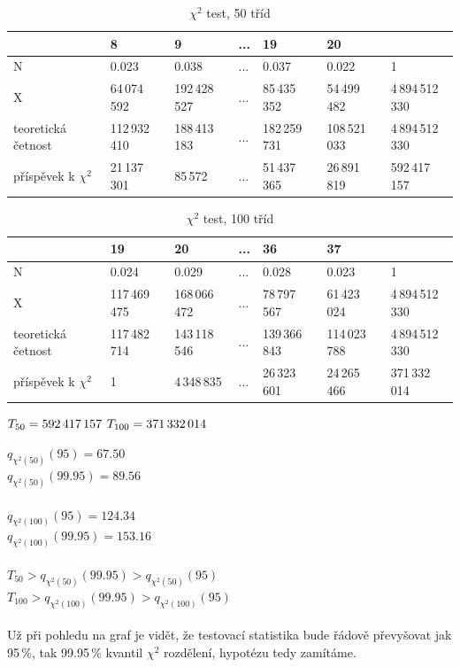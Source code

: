 \documentclass[fleqn,11pt]{article}
\begin{document}
    \begin{table}[htp]
        \footnotesize
        \caption*{$\chi^2$ test, 50 tříd}
        \centering
        \begin{tabular}{|l|l|l|l|l|l||l|}
        \hline
         & 8 & 9 & ... & 19 & 20 & \\ \hline
        N& 0.023 & 0.038 & ... & 0.037 & 0.022 & 1 \\ \hline
        X& 64\,074\,592 & 192\,428\,527 & ... & 85\,435\,352 & 54\,499\,482 & 4\,894\,512\,330 \\ \hline
        teoretická četnost& 112\,932\,410 & 188\,413\,183 & ... & 182\,259\,731 & 108\,521\,033 & 4\,894\,512\,330 \\ \hline
        příspěvek k $\chi^2$& 21\,137\,301 & 85\,572 & ... & 51\,437\,365 & 26\,891\,819 & 592\,417\,157 \\ \hline
        \end{tabular}
    \end{table}

    \begin{table}[htp]
        \footnotesize
        \caption*{$\chi^2$ test, 100 tříd}
        \centering
        \begin{tabular}{|l|l|l|l|l|l||l|}
        \hline
         & 19 & 20 & ... & 36 & 37 & \\ \hline
        N& 0.024 & 0.029 & ... & 0.028 & 0.023 & 1 \\ \hline
        X& 117\,469\,475 & 168\,066\,472 & ... & 78\,797\,567 & 61\,423\,024 & 4\,894\,512\,330 \\ \hline
        teoretická četnost& 117\,482\,714 & 143\,118\,546 & ... & 139\,366\,843 & 114\,023\,788 & 4\,894\,512\,330 \\ \hline
        příspěvek k $\chi^2$& 1 & 4\,348\,835 & ... & 26\,323\,601 & 24\,265\,466 & 371\,332\,014 \\ \hline
        \end{tabular}
    \end{table}


    $T_{50} = 592\,417\,157\\$
    $T_{100} = 371\,332\,014\\$

    $q_{\chi^2(50)}(95) =  67.50$\\
    $q_{\chi^2(50)}(99.95) =  89.56$\\
    \\
    $q_{\chi^2(100)}(95) =  124.34$\\
    $q_{\chi^2(100)}(99.95) =  153.16$\\
    \\
    $T_{50} > q_{\chi^2(50)}(99.95) > q_{\chi^2(50)}(95)$\\
    $T_{100} > q_{\chi^2(100)}(99.95) > q_{\chi^2(100)}(95)$\\
    \\
    Už při pohledu na graf je vidět, že testovací statistika bude řádově převyšovat jak 95\,\%, tak 99.95\,\% kvantil $\chi^2$ rozdělení, hypotézu tedy zamítáme.
\end{document}
